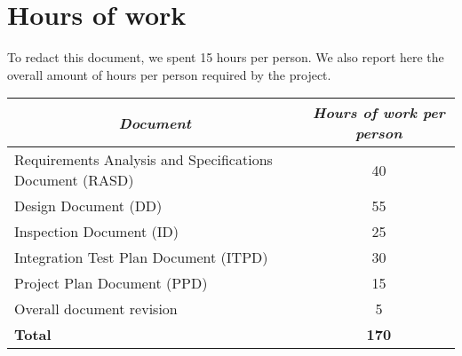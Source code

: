 \chapter{Hours of work}
To redact this document, we spent 15 hours per person. We also report here the overall amount of hours per person required by the project.
\begin{center}
\setlength{\LTleft}{-15pt}
\begin{longtable}{|l|c|}
\hline
\multicolumn{1}{|c|}{\textit{Document}} & \textit{Hours of work per person} \\
\hline\hline
Requirements Analysis and Specifications
Document (RASD) &
40 \\\hline
Design Document (DD) &
55 \\\hline
Inspection Document (ID) &
25 \\\hline
Integration Test Plan Document (ITPD) &
30 \\\hline
Project Plan Document (PPD) &
15 \\\hline
Overall document revision &
5 \\\hline\hline
\textbf{Total} & \textbf{170} \\\hline
\end{longtable}
\end{center}
